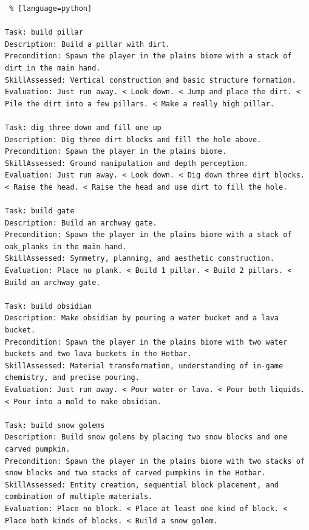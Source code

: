 \begin{lstlisting} % [language=python]  

Task: build pillar
Description: Build a pillar with dirt. 
Precondition: Spawn the player in the plains biome with a stack of dirt in the main hand. 
SkillAssessed: Vertical construction and basic structure formation.
Evaluation: Just run away. < Look down. < Jump and place the dirt. < Pile the dirt into a few pillars. < Make a really high pillar.

Task: dig three down and fill one up
Description: Dig three dirt blocks and fill the hole above.  
Precondition: Spawn the player in the plains biome. 
SkillAssessed: Ground manipulation and depth perception. 
Evaluation: Just run away. < Look down. < Dig down three dirt blocks. < Raise the head. < Raise the head and use dirt to fill the hole. 

Task: build gate
Description: Build an archway gate. 
Precondition: Spawn the player in the plains biome with a stack of oak_planks in the main hand. 
SkillAssessed: Symmetry, planning, and aesthetic construction.
Evaluation: Place no plank. < Build 1 pillar. < Build 2 pillars. < Build an archway gate. 

Task: build obsidian
Description: Make obsidian by pouring a water bucket and a lava bucket. 
Precondition: Spawn the player in the plains biome with two water buckets and two lava buckets in the Hotbar. 
SkillAssessed: Material transformation, understanding of in-game chemistry, and precise pouring.
Evaluation: Just run away. < Pour water or lava. < Pour both liquids. < Pour into a mold to make obsidian. 

Task: build snow golems
Description: Build snow golems by placing two snow blocks and one carved pumpkin. 
Precondition: Spawn the player in the plains biome with two stacks of snow blocks and two stacks of carved pumpkins in the Hotbar. 
SkillAssessed: Entity creation, sequential block placement, and combination of multiple materials. 
Evaluation: Place no block. < Place at least one kind of block. < Place both kinds of blocks. < Build a snow golem. 

\end{lstlisting}



